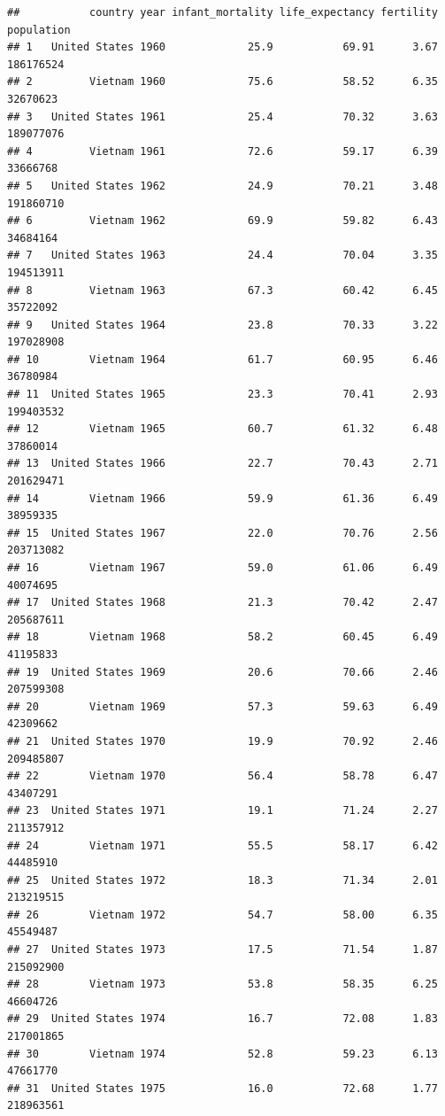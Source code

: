 \documentclass[
]{article}
\begin{document}
\begin{verbatim}
##           country year infant_mortality life_expectancy fertility population
## 1   United States 1960             25.9           69.91      3.67  186176524
## 2         Vietnam 1960             75.6           58.52      6.35   32670623
## 3   United States 1961             25.4           70.32      3.63  189077076
## 4         Vietnam 1961             72.6           59.17      6.39   33666768
## 5   United States 1962             24.9           70.21      3.48  191860710
## 6         Vietnam 1962             69.9           59.82      6.43   34684164
## 7   United States 1963             24.4           70.04      3.35  194513911
## 8         Vietnam 1963             67.3           60.42      6.45   35722092
## 9   United States 1964             23.8           70.33      3.22  197028908
## 10        Vietnam 1964             61.7           60.95      6.46   36780984
## 11  United States 1965             23.3           70.41      2.93  199403532
## 12        Vietnam 1965             60.7           61.32      6.48   37860014
## 13  United States 1966             22.7           70.43      2.71  201629471
## 14        Vietnam 1966             59.9           61.36      6.49   38959335
## 15  United States 1967             22.0           70.76      2.56  203713082
## 16        Vietnam 1967             59.0           61.06      6.49   40074695
## 17  United States 1968             21.3           70.42      2.47  205687611
## 18        Vietnam 1968             58.2           60.45      6.49   41195833
## 19  United States 1969             20.6           70.66      2.46  207599308
## 20        Vietnam 1969             57.3           59.63      6.49   42309662
## 21  United States 1970             19.9           70.92      2.46  209485807
## 22        Vietnam 1970             56.4           58.78      6.47   43407291
## 23  United States 1971             19.1           71.24      2.27  211357912
## 24        Vietnam 1971             55.5           58.17      6.42   44485910
## 25  United States 1972             18.3           71.34      2.01  213219515
## 26        Vietnam 1972             54.7           58.00      6.35   45549487
## 27  United States 1973             17.5           71.54      1.87  215092900
## 28        Vietnam 1973             53.8           58.35      6.25   46604726
## 29  United States 1974             16.7           72.08      1.83  217001865
## 30        Vietnam 1974             52.8           59.23      6.13   47661770
## 31  United States 1975             16.0           72.68      1.77  218963561

\end{verbatim}
\end{document}
